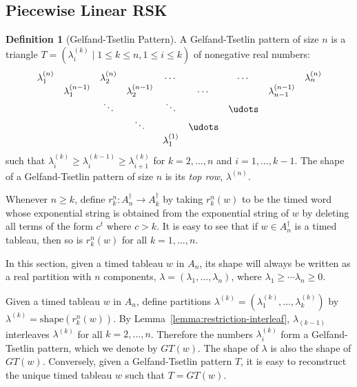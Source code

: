 \documentclass[10pt]{amsproc}
\theoremstyle{definition}
\newtheorem{definition}[theorem]{Definition}
\theoremstyle{remark}
\newcommand{\shape}{\mathrm{shape}}
\begin{document}
\subsection{Piecewise Linear RSK}
\label{sec:piecewise-linear-rsk}
\begin{definition}
  [Gelfand-Tsetlin Pattern]
  A Gelfand-Tsetlin pattern of size $n$ is a triangle $T=(\lambda^{(k)}_i\mid 1\leq k \leq n, 1\leq i \leq k)$ of nonegative real numbers:
  \begin{displaymath}
    \begin{matrix}
      \lambda^{(n)}_1 & & \lambda^{(n)}_2 && \dotsb && \dotsb && \lambda^{(n)}_n\\
      &\lambda^{(n-1)}_1 && \lambda^{(n-1)}_2 && \dotsb && \lambda^{(n-1)}_{n-1} & \\
      && \ddots && \ddots && \udots &&  \\
      &&& \ddots && \udots &&&\\
      &&&& \lambda^{(1)}_1 &&&&
    \end{matrix}
  \end{displaymath}
  such that $\lambda^{(k)}_i\geq \lambda^{(k-1)}_i\geq \lambda^{(k)}_{i+1}$ for $k=2,\dotsc,n$ and $i=1,\dotsc, k-1$.
  The shape of a Gelfand-Tsetlin pattern of size $n$ is its \emph{top row}, $\lambda^{(n)}$.
\end{definition}
Whenever $n\geq k$, define $r^n_k:A_n^\dagger\to A_k^\dagger$ by taking $r^n_k(w)$ to be the timed word whose exponential string is obtained from the exponential string of $w$ by deleting all terms of the form $c^t$ where $c>k$.
It is easy to see that if $w\in A_n^\dagger$ is a timed tableau, then so is $r^n_k(w)$ for all $k=1,\dotsc,n$.

In this section, given a timed tableau $w$ in $A_n$, its shape will always be written as a real partition with $n$ components, $\lambda=(\lambda_1,\dotsc,\lambda_n)$, where $\lambda_1\geq \dotsb \lambda_n\geq 0$.

Given a timed tableau $w$ in $A_n$, define partitions $\lambda^{(k)}=(\lambda^{(k)}_1,\dotsc,\lambda^{(k)}_k)$ by $\lambda^{(k)} = \shape(r^n_k(w))$.
By Lemma~\ref{lemma:restriction-interleaf}, $\lambda_{(k-1)}$ interleaves $\lambda^{(k)}$ for all $k=2,\dotsc,n$.
Therefore the numbers $\lambda^{(k)}_i$ form a Gelfand-Tsetlin pattern, which we denote by $GT(w)$.
The shape of $\lambda$ is also the shape of $GT(w)$.
Conversely, given a Gelfand-Tsetlin pattern $T$, it is easy to reconstruct the unique timed tableau $w$ such that $T=GT(w)$.
\end{document}
